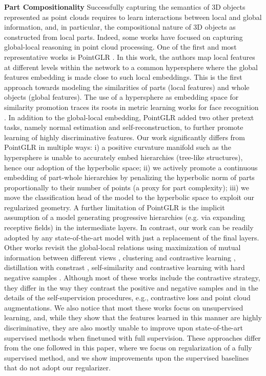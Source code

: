 \documentclass{article}
\begin{document}
\textbf{Part Compositionality} Successfully capturing the semantics of 3D objects represented as point clouds requires to learn interactions between local and global information, and, in particular, the compositional nature of 3D objects as constructed from local parts. Indeed, some works have focused on capturing global-local reasoning in point cloud processing. One of the first and most representative works is PointGLR \cite{rao2020global}. In this work, the authors map local features at different levels within the network to a common hypersphere where the global features embedding is made close to such local embeddings. This is the first approach towards modeling the similarities of parts (local features) and whole objects (global features). The use of a hypersphere as embedding space for similarity promotion traces its roots in metric learning works for face recognition \cite{deng2019arcface}. In addition to the global-local embedding, PointGLR added two other pretext tasks, namely normal estimation and self-reconstruction, to further promote learning of highly discriminative features. Our work significantly differs from PointGLR in multiple ways: i) a positive curvature manifold such as the hypersphere is unable to accurately embed hierarchies (tree-like structures), hence our adoption of the hyperbolic space; ii) we actively promote a continuous embedding of part-whole hierarchies by penalizing the hyperbolic norm of parts proportionally to their number of points (a proxy for part complexity); iii) we move the classification head of the model to the hyperbolic space to exploit our regularized geometry. A further limitation of PointGLR is the implicit assumption of a model generating progressive hierarchies (e.g. via expanding receptive fields) in the intermediate layers. In contrast, our work can be readily adopted by any state-of-the-art model with just a replacement of the final layers.
Other works revisit the global-local relations using maximization of mutual information between different views \cite{sanghi2020info3d}, clustering and contrastive learning \cite{mei2022unsupervised}, distillation with constrast \cite{fu2022distillation}, self-similarity and contrastive learning with hard negative samples \cite{du2021self}.
Although most of these works include the contrastive strategy, they differ in the way they contrast the positive and negative samples and in the details of the self-supervision procedures, e.g., contrastive loss and point cloud augmentations. We also notice that most these works focus on unsupervised learning, and, while they show that the features learned in this manner are highly discriminative, they are also mostly unable to improve upon state-of-the-art supervised methods when finetuned with full supervision. 
These approaches differ from the one followed in this paper, where we focus on regularization of a fully supervised method, and we show improvements upon the supervised baselines that do not adopt our regularizer.
\end{document}
